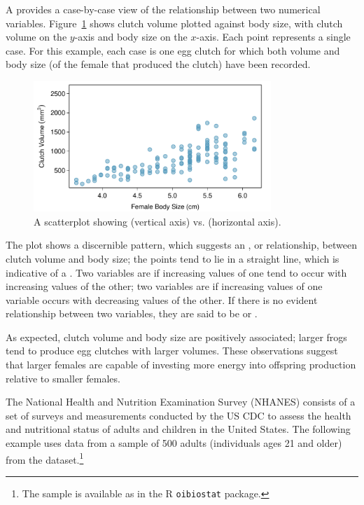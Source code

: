 A  provides a case-by-case view of the relationship between two numerical variables. Figure~\ref{frogClutchVolBodySize} shows clutch volume plotted against body size, with clutch volume on the $y$-axis and body size on the $x$-axis. Each point represents a single case. For this example, each case is one egg clutch for which both volume and body size (of the female that produced the clutch) have been recorded.

\begin{figure}[h]
	\centering
	\includegraphics[width=0.8\textwidth]
	{ch_01a_intro_to_data_oi_biostat/figures/frogClutchVolBodySize/frogClutchVolBodySize}
	\caption{A scatterplot showing  (vertical axis) vs.  (horizontal axis). }
	\label{frogClutchVolBodySize}
\end{figure}


The plot shows a discernible pattern, which suggests an , or relationship,  between clutch volume and body size; the points tend to lie in a straight line, which is indicative of a . Two variables are  if increasing values of one tend to occur with increasing values of the other; two variables are  if increasing values of one variable occurs with decreasing values of the other. If there is no evident relationship between two variables, they are said to be  or .

As expected, clutch volume and body size are positively associated; larger frogs tend to produce egg clutches with larger volumes. These observations suggest that larger females are capable of investing more energy into offspring production relative to smaller females.


The National Health and Nutrition Examination Survey (NHANES) consists of a set of surveys and measurements conducted by the US CDC to assess the health and nutritional status of adults and children in the United States. The following example uses data from a sample of 500 adults (individuals ages 21 and older) from the  dataset.\footnote{The sample is available as  in the \textsf{R} \texttt{oibiostat} package.}

